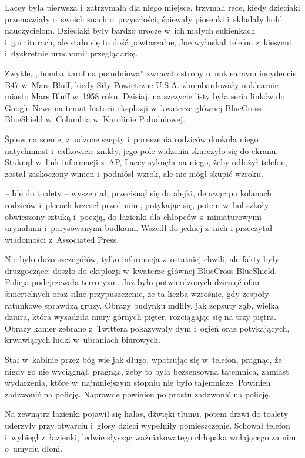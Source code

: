 \documentclass[oneside,polish,11pt,sfheadings]{mwbk}
\begin{document}
Lacey była pierwsza i~zatrzymała dla niego miejsce, trzymali ręce, kiedy
dzieciaki przemawiały o~swoich snach o~przyszłości, śpiewały piosenki i~składały hołd nauczycielom. Dzieciaki były bardzo urocze w~ich małych
sukienkach i~garniturach, ale stało się to dość powtarzalne, Joe
wyłuskał telefon z~kieszeni i~dyskretnie uruchomił przeglądarkę.

Zwykle, ,,bomba karolina południowa'' zwracało strony o~nuklearnym
incydencie B47 w~Mars Bluff, kiedy Siły Powietrzne U.S.A. zbombardowały
nuklearnie miasto Mars Bluff w~1958 roku. Dzisiaj, na szczycie listy
była seria linków do Google News na temat historii eksplozji w~kwaterze
głównej BlueCross BlueShield w~Columbia w~Karolinie Południowej.

Śpiew na scenie, znudzone szepty i~poruszenia rodziców dookoła niego
natychmiast i~całkowicie znikły, jego pole widzenia skurczyło się do
ekranu. Stuknął w~link informacji z~AP, Lacey syknęła na niego, żeby
odłożył telefon, został zaskoczony winien i~podniósł wzrok, ale nie mógł
skupić wzroku.

-- Idę do toalety -- wyszeptał, przecisnął się do alejki, depcząc po
kolanach rodziców i~plecach krzeseł przed nimi, potykając się, potem w~hol szkoły obwieszony sztuką i~poezją, do łazienki dla chłopców z~miniaturowymi urynałami i~porysowanymi budkami. Wszedł do jednej z~nich
i przeczytał wiadomości z~Associated Press.

Nie było dużo szczegółów, tylko informacja z~ostatniej chwili, ale fakty
były druzgoczące: doszło do eksplozji w~kwaterze głównej BlueCross
BlueShield. Policja podejrzewała terroryzm. Już było potwierdzonych
dziesięć ofiar śmiertelnych oraz silne przypuszczenie, że ta liczba
wzrośnie, gdy zespoły ratunkowe sprawdzą gruzy. Obrazy budynku mdliły,
jak zepsuty ząb, wielka dziura, która wysadziła mury górnych pięter,
rozciągając się na trzy piętra. Obrazy kamer zebrane z~Twittera
pokazywały dym i~ogień oraz potykających, krwawiących ludzi w~ubraniach
biurowych.

Stał w~kabinie przez bóg wie jak długo, wpatrując się w~telefon,
pragnąc, że nigdy go nie wyciągnął, pragnąc, żeby to była bezsensowna
tajemnica, zamiast wydarzenia, które w~najmniejszym stopniu nie było
tajemnicze. Powinien zadzwonić na policję. Naprawdę powinien po prostu
zadzwonić na policję.

Na zewnątrz łazienki pojawił się hałas, dźwięki tłumu, potem drzwi do
toalety uderzyły przy otwarciu i~głosy dzieci wypełniły pomieszczenie.
Schował telefon i~wybiegł z~łazienki, ledwie słysząc ważniakowatego
chłopaka wołającego za nim o~umyciu dłoni.
\end{document}
